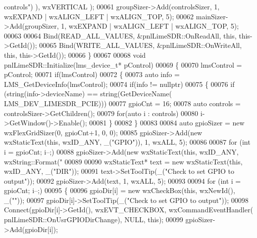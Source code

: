 \begin{DoxyCode}
{       controls"}) ), wxVERTICAL );
00061     groupSizer->Add(controlsSizer, 1, wxEXPAND | wxALIGN\_LEFT | wxALIGN\_TOP, 5);
00062     mainSizer->Add(groupSizer, 1, wxEXPAND | wxALIGN\_LEFT | wxALIGN\_TOP, 5);
00063 
00064     Bind(READ\_ALL\_VALUES, &pnlLimeSDR::OnReadAll, \textcolor{keyword}{this}, this->GetId());
00065     Bind(WRITE\_ALL\_VALUES, &pnlLimeSDR::OnWriteAll, \textcolor{keyword}{this}, this->GetId());
00066 \}
00067 
00068 \textcolor{keywordtype}{void} pnlLimeSDR::Initialize(lms_device_t* pControl)
00069 \{
00070     lmsControl = pControl;
00071     \textcolor{keywordflow}{if}(lmsControl)
00072     \{
00073         \textcolor{keyword}{auto} info = LMS_GetDeviceInfo(lmsControl);
00074         \textcolor{keywordflow}{if}(info != \textcolor{keyword}{nullptr})
00075         \{
00076             \textcolor{keywordflow}{if} (\textcolor{keywordtype}{string}(info->deviceName) == \textcolor{keywordtype}{string}(GetDeviceName(
      LMS_DEV_LIMESDR_PCIE)))
00077                 gpioCnt = 16;
00078             \textcolor{keyword}{auto} controls = controlsSizer->GetChildren();
00079             \textcolor{keywordflow}{for}(\textcolor{keyword}{auto} i : controls)
00080                 i->GetWindow()->Enable();
00081         \}
00082     \}
00083 
00084     \textcolor{keyword}{auto} gpioSizer = \textcolor{keyword}{new} wxFlexGridSizer(0, gpioCnt+1, 0, 0);
00085     gpioSizer->Add(\textcolor{keyword}{new} wxStaticText(\textcolor{keyword}{this}, wxID\_ANY, \_(\textcolor{stringliteral}{"GPIO"})), 1, wxALL, 5);
00086 
00087     \textcolor{keywordflow}{for} (\textcolor{keywordtype}{int} i = gpioCnt; i--;)
00088         gpioSizer->Add(\textcolor{keyword}{new} wxStaticText(\textcolor{keyword}{this}, wxID\_ANY, wxString::Format(\textcolor{stringliteral}{"%
00089 
00090     wxStaticText* text = \textcolor{keyword}{new} wxStaticText(\textcolor{keyword}{this}, wxID\_ANY, \_(\textcolor{stringliteral}{"DIR"}));
00091     text->SetToolTip(\_(\textcolor{stringliteral}{"Check to set GPIO to output"}));
00092     gpioSizer->Add(text, 1, wxALL, 5);
00093 
00094     \textcolor{keywordflow}{for} (\textcolor{keywordtype}{int} i = gpioCnt; i--;)
00095     \{
00096         gpioDir[i] = \textcolor{keyword}{new} wxCheckBox(\textcolor{keyword}{this}, wxNewId(), \_(\textcolor{stringliteral}{""}));
00097         gpioDir[i]->SetToolTip(\_(\textcolor{stringliteral}{"Check to set GPIO to output"}));
00098         Connect(gpioDir[i]->GetId(), wxEVT\_CHECKBOX, wxCommandEventHandler(
      pnlLimeSDR::OnUsrGPIODirChange), NULL, \textcolor{keyword}{this});
00099         gpioSizer->Add(gpioDir[i]);
}
\end{DoxyCode}
